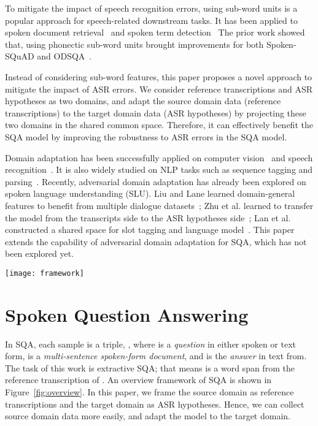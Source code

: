 \documentclass{article}
\begin{document}
To mitigate the impact of speech recognition errors, using sub-word units is a popular approach for speech-related downstream tasks.
It has been applied to spoken document retrieval~\cite{ng1997subword} and spoken term detection~\cite{van2017constructing}
The prior work showed that, using phonectic sub-word units brought improvements for both Spoken-SQuAD and ODSQA~\cite{li2018spoken}.


Instead of considering sub-word features, this paper proposes a novel approach to mitigate the impact of ASR errors.
We consider reference transcriptions  and ASR hypotheses as two domains, and
adapt the source domain data (reference transcriptions) to the target domain data (ASR hypotheses) by projecting these two domains in the shared common space.
Therefore, it can effectively benefit the SQA model by improving the robustness to ASR errors in the SQA model.

Domain adaptation has been successfully applied on computer vision~\cite{ganin2016domain} and speech recognition~\cite{shinohara2016adversarial}. 
It is also widely studied on NLP tasks such as sequence tagging and parsing~\cite{yang2017transfer,mcclosky2010automatic,chiticariu2010domain}. 
Recently, adversarial domain adaptation has already been explored on spoken language understanding (SLU).
Liu and Lane learned domain-general features to benefit from multiple dialogue datasets~\cite{liu2017multi}; Zhu et al. learned to transfer the model from the transcripts side to the ASR hypotheses side~\cite{zhu2018robust}; Lan et al. constructed a shared space for slot tagging and language model~\cite{lan2018semi}.
This paper extends the capability of adversarial domain adaptation for SQA, which has not been explored yet. 


\begin{figure*}[t]
  \vspace{-3mm}
  \centering
  \texttt{[image: framework]}
  \vspace{-5mm}
  \caption{Flow diagram of the SQA system. }
  \label{fig:overview}


\end{figure*}


\section{Spoken Question Answering}

In SQA, each sample is a triple, , where  is a \emph{question} in either spoken or text form,  is a \emph{multi-sentence spoken-form document}, and  is the \emph{answer} in text from.
The task of this work is extractive SQA; that means  is a word span from the reference transcription of .
An overview framework of SQA is shown in Figure~\ref{fig:overview}.
In this paper, we frame the source domain as reference transcriptions and the target domain as ASR hypotheses.
Hence, we can collect source domain data more easily, and adapt the model to the target domain.
\end{document}
